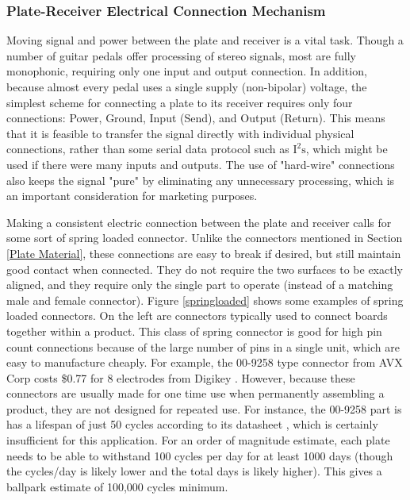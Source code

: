 \documentclass{article}
\begin{document}
		\subsubsection{Plate-Receiver Electrical Connection Mechanism}
		\label{Pogo Pins}
		Moving signal and power between the plate and receiver is a vital task.  Though a number of guitar pedals offer processing of stereo signals, most are fully monophonic, requiring only one input and output connection.  In addition, because almost every pedal uses a single supply (non-bipolar) voltage, the simplest scheme for connecting a plate to its receiver requires only four connections: Power, Ground, Input (Send), and Output (Return).  This means that it is feasible to transfer the signal directly with individual physical connections, rather than some serial data protocol such as $\text{I}^2\text{s}$, which might be used if there were many inputs and outputs.  The use of "hard-wire" connections also keeps the signal "pure" by eliminating any unnecessary processing, which is an important consideration for marketing purposes.

		Making a consistent electric connection between the plate and receiver calls for some sort of spring loaded connector.  Unlike the connectors mentioned in Section \ref{Plate Material}, these connections are easy to break if desired, but still maintain good contact when connected.  They do not require the two surfaces to be exactly aligned, and they require only the single part to operate (instead of a matching male and female connector).  Figure \ref{springloaded} shows some examples of spring loaded connectors.  On the left are connectors typically used to connect boards together within a product.  This class of spring connector is good for high pin count connections because of the large number of pins in a single unit, which are easy to manufacture cheaply.  For example, the 00-9258 type connector from AVX Corp costs \$0.77 for 8 electrodes from Digikey \cite{AVX_00-9258_Digikey}.  However, because these connectors are usually made for one time use when permanently assembling a product, they are not designed for repeated use.  For instance, the 00-9258 part is has a lifespan of just 50 cycles according to its datasheet \cite{AVX_00-9258_Datasheet}, which is certainly insufficient for this application.  For an order of magnitude estimate, each plate needs to be able to withstand 100 cycles per day for at least 1000 days (though the cycles/day is likely lower and the total days is likely higher).  This gives a ballpark estimate of 100,000 cycles minimum.
\end{document}
